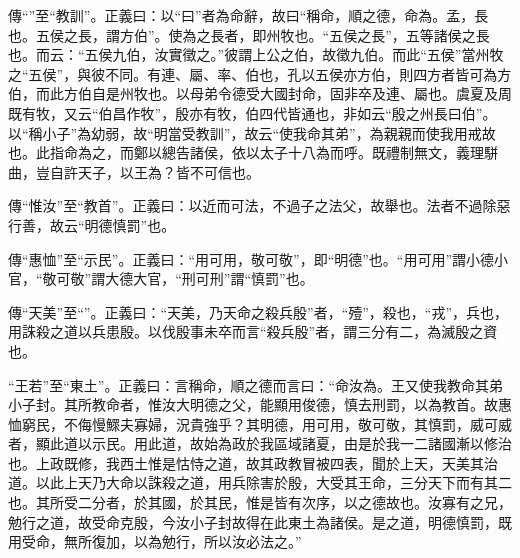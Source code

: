 {\noindent\zhuan{}\fzbyks 傳“”至“教訓”。正義曰：以“曰”者為命辭，故曰“稱命，順之德，命為。孟，長也。五侯之長，謂方伯”。使為之長者，即州牧也。“五侯之長”，五等諸侯之長也。而云：“五侯九伯，汝實徵之。”彼謂上公之伯，故徵九伯。而此“五侯”當州牧之“五侯”，與彼不同。有連、屬、率、伯也，孔以五侯亦方伯，則四方者皆可為方伯，而此方伯自是州牧也。以母弟令德受大國封命，固非卒及連、屬也。虞夏及周既有牧，又云“伯昌作牧”，殷亦有牧，伯四代皆通也，非如云“殷之州長曰伯”。以“稱小子”為幼弱，故“明當受教訓”，故云“使我命其弟”，為親親而使我用戒故也。此指命為之，而鄭以總告諸侯，依以太子十八為而呼。既禮制無文，義理駢曲，豈自許天子，以王為？皆不可信也。 \par}

{\noindent\zhuan{}\fzbyks 傳“惟汝”至“教首”。正義曰：以近而可法，不過子之法父，故舉也。法者不過除惡行善，故云“明德慎罰”也。 \par}

{\noindent\zhuan{}\fzbyks 傳“惠恤”至“示民”。正義曰：“用可用，敬可敬”，即“明德”也。“用可用”謂小德小官，“敬可敬”謂大德大官，“刑可刑”謂“慎罰”也。 \par}

{\noindent\zhuan{}\fzbyks 傳“天美”至“”。正義曰：“天美，乃天命之殺兵殷”者，“殪”，殺也，“戎”，兵也，用誅殺之道以兵患殷。以伐殷事未卒而言“殺兵殷”者，謂三分有二，為滅殷之資也。 \par}

{\noindent\shu{}\fzkt “王若”至“東土”。正義曰：言稱命，順之德而言曰：“命汝為。王又使我教命其弟小子封。其所教命者，惟汝大明德之父，能顯用俊德，慎去刑罰，以為教首。故惠恤窮民，不侮慢鰥夫寡婦，況貴強乎？其明德，用可用，敬可敬，其慎罰，威可威者，顯此道以示民。用此道，故始為政於我區域諸夏，由是於我一二諸國漸以修治也。上政既修，我西土惟是怙恃之道，故其政教冒被四表，聞於上天，天美其治道。以此上天乃大命以誅殺之道，用兵除害於殷，大受其王命，三分天下而有其二也。其所受二分者，於其國，於其民，惟是皆有次序，以之德故也。汝寡有之兄，勉行之道，故受命克殷，今汝小子封故得在此東土為諸侯。是之道，明德慎罰，既用受命，無所復加，以為勉行，所以汝必法之。” \par}

